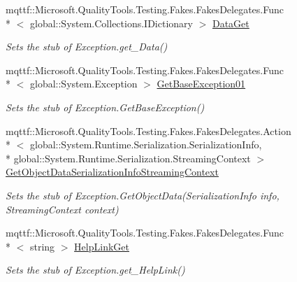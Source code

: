 \begin{DoxyCompactItemize}
\item 
mqttf\-::\-Microsoft.\-Quality\-Tools.\-Testing.\-Fakes.\-Fakes\-Delegates.\-Func\\*
$<$ global\-::\-System.\-Collections.\-I\-Dictionary $>$ \hyperlink{class_system_1_1_fakes_1_1_stub_operation_canceled_exception_ab1545011b7e13a4aee5e68fea32bd40e}{Data\-Get}
\begin{DoxyCompactList}\small\item\em Sets the stub of Exception.\-get\-\_\-\-Data()\end{DoxyCompactList}\item 
mqttf\-::\-Microsoft.\-Quality\-Tools.\-Testing.\-Fakes.\-Fakes\-Delegates.\-Func\\*
$<$ global\-::\-System.\-Exception $>$ \hyperlink{class_system_1_1_fakes_1_1_stub_operation_canceled_exception_a6b6ef7dcfbf3c74dad4752a5f303b789}{Get\-Base\-Exception01}
\begin{DoxyCompactList}\small\item\em Sets the stub of Exception.\-Get\-Base\-Exception()\end{DoxyCompactList}\item 
mqttf\-::\-Microsoft.\-Quality\-Tools.\-Testing.\-Fakes.\-Fakes\-Delegates.\-Action\\*
$<$ global\-::\-System.\-Runtime.\-Serialization.\-Serialization\-Info, \\*
global\-::\-System.\-Runtime.\-Serialization.\-Streaming\-Context $>$ \hyperlink{class_system_1_1_fakes_1_1_stub_operation_canceled_exception_a608d19cb3c0302d94c427e42abf216ac}{Get\-Object\-Data\-Serialization\-Info\-Streaming\-Context}
\begin{DoxyCompactList}\small\item\em Sets the stub of Exception.\-Get\-Object\-Data(\-Serialization\-Info info, Streaming\-Context context)\end{DoxyCompactList}\item 
mqttf\-::\-Microsoft.\-Quality\-Tools.\-Testing.\-Fakes.\-Fakes\-Delegates.\-Func\\*
$<$ string $>$ \hyperlink{class_system_1_1_fakes_1_1_stub_operation_canceled_exception_af032fa9c5a2cf29f6e81efd74ae4cb35}{Help\-Link\-Get}
\begin{DoxyCompactList}\small\item\em Sets the stub of Exception.\-get\-\_\-\-Help\-Link()\end{DoxyCompactList}\item 

\end{DoxyCompactItemize}
